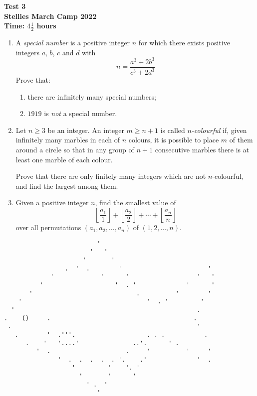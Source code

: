 \documentclass{article}
\begin{document}
\thispagestyle{empty}

\begin{center}
  \textbf{\Large Test 3}
  \\ \vspace{1em}
  \textbf{\large Stellies March Camp 2022}
  \\ \vspace{1em}
  \textbf{\large Time: $4\frac{1}{2}$ hours}
\end{center}

\vspace{24pt}

\begin{enumerate}[itemsep=12pt]

\item %
A \textit{special number} is a positive integer $n$ for which there exists positive integers $a$, $b$, $c$ and $d$ with $$n = \frac{a^3+2b^3}{c^3+2d^3}$$
Prove that:
\begin{enumerate}
	\item there are infinitely many special numbers;
	\item $1919$ is \textit{not} a special number.
\end{enumerate}


\item %
Let $n \geq 3$ be an integer.
An integer $m \geq n+1$ is called \emph{$n$-colourful} if, given infinitely many marbles in each of $n$ colours, it is possible to place $m$ of them around a circle so that in any group of $n+1$ consecutive marbles there is at least one marble of each colour.

Prove that there are only finitely many integers which are not $n$-colourful, and find the largest among them.

\item %
\newcommand{\floorf}[2]{\left\lfloor\frac{#1}{#2}\right\rfloor}
Given a positive integer $n$, find the smallest value of
\[ \floorf{a_1}{1} +\floorf{a_2}{2} +\dotsb +\floorf{a_n}{n} \]
over all permutations $(a_1, a_2, \dotsc, a_n)$ of $(1, 2, \dotsc, n)$.

\end{enumerate}

\vfill
\centering \small
\begin{BVerbatim}
                          '
                        '   '
                      '       '
                 .  '  .        '                        '
             '             '      '                   '   '
          '                    '  . '              '      '
       '                             .          '        '
    '                                   '  . '         '
  '                                                   .
.    ()     .                                        .
 .                                                    '
   .        '  .'''.                    . . .           .
      .    '   '....'               ..'.      ' .
         '  .                     .     '          '     '
               '  .  .  .  .  . '.    .'              '  .
                   '         '    '. '
                     '       '      '
                       ' .  '
                          '
\end{BVerbatim}
\end{document}
